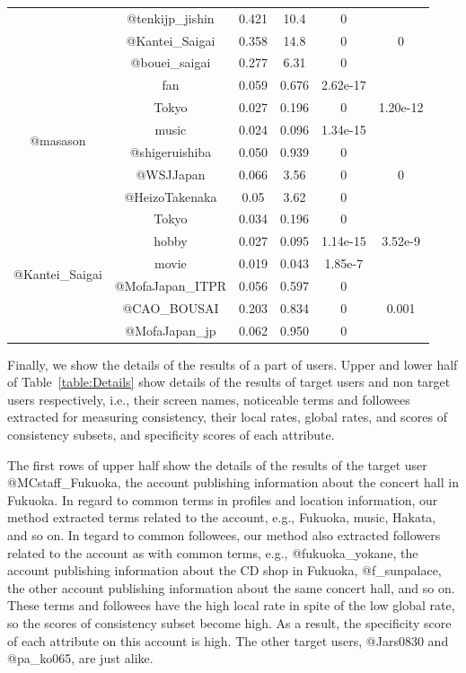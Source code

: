 \begin{table}[p]
\begin{center}
{\begin{tabular}{cccccc}
 & @tenkijp\_jishin & 0.421 & 10.4 & 0  & \\
 & @Kantei\_Saigai & 0.358 & 14.8 & 0 & 0 \\
 & @bouei\_saigai & 0.277 & 6.31 & 0 & \\ \midrule
 \multirow{6}{*}{@masason} & fan & 0.059 & 0.676 & 2.62e-17 \\
 & Tokyo & 0.027 & 0.196 & 0 & 1.20e-12 \\
 & music & 0.024 & 0.096 & 1.34e-15 & \\ \cmidrule(lr){2-6}
 & @shigeruishiba & 0.050 & 0.939 & 0 & \\
 & @WSJJapan & 0.066 & 3.56 & 0 & 0 \\
 & @HeizoTakenaka & 0.05 & 3.62 & 0 & \\ \midrule
 \multirow{6}{*}{@Kantei\_Saigai} & Tokyo & 0.034 & 0.196 & 0 & \\
 & hobby & 0.027 & 0.095 & 1.14e-15 & 3.52e-9 \\
 & movie & 0.019 & 0.043 & 1.85e-7 & \\ \cmidrule(lr){2-6}
 & @MofaJapan\_ITPR & 0.056 & 0.597 & 0 & \\
 & @CAO\_BOUSAI & 0.203 & 0.834 & 0 & 0.001 \\
 & @MofaJapan\_jp & 0.062 & 0.950 & 0 & \\ \bottomrule
\end{tabular}
}
\end{center}
\end{table}

Finally, we show the details of the results of a part of users.  Upper
and lower half of Table~\ref{table:Details} show details of the results
of target users and non target users respectively, i.e., their screen
names, noticeable terms and followees extracted for measuring
consistency, their local rates, global rates, and scores of consistency
subsets, and specificity scores of each attribute.

The first rows of upper half show the details of the results of the
target user @MCstaff\_Fukuoka, the account publishing information about
the concert hall in Fukuoka.  In regard to common terms in profiles and
location information, our method extracted terms related to the account,
e.g., Fukuoka, music, Hakata, and so on.  In tegard to common followees,
our method also extracted followers related to the account as with
common terms, e.g., @fukuoka\_yokane, the account publishing information
about the CD shop in Fukuoka, @f\_sunpalace, the other account
publishing information about the same concert hall, and so on.  These
terms and followees have the high local rate in spite of the low global
rate, so the scores of consistency subset become high.  As a result, the
specificity score of each attribute on this account is high.  The other
target users, @Jars0830 and @pa\_ko065, are just alike.

